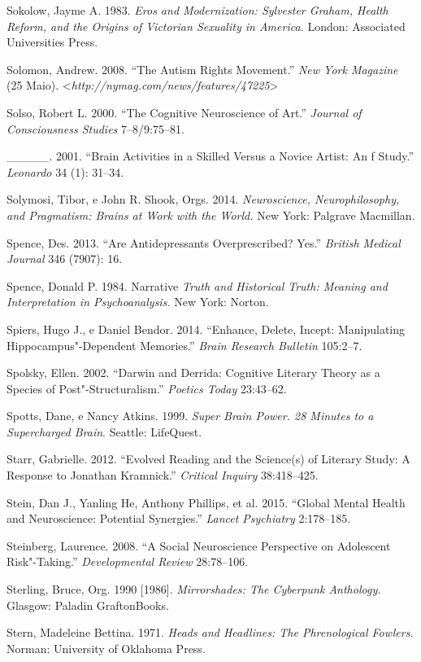 {\begin{Parskip}
Sokolow, Jayme A. 1983. \emph{Eros and Modernization: Sylvester Graham,
Health Reform, and the Origins of Victorian Sexuality in America.}
London: Associated Universities Press.

Solomon, Andrew. 2008. ``The Autism Rights Movement.'' \emph{New York
Magazine} (25 Maio). \textless{}\emph{http://nymag.com/news/features/47225}\textgreater{}

Solso, Robert L. 2000. ``The Cognitive Neuroscience of Art.''
\emph{Journal of Consciousness Studies} 7--8/9:75--81.

\_\_\_\_\_. 2001. ``Brain Activities in a Skilled Versus a Novice Artist:
An f Study.'' \emph{Leonardo} 34 (1): 31--34.

Solymosi, Tibor, e John R. Shook, Orgs. 2014. \emph{Neuroscience,
Neurophilosophy, and Pragmatism: Brains at Work with the World.} New
York: Palgrave Macmillan.

Spence, Des. 2013. ``Are Antidepressants Overprescribed? Yes.''
\emph{British Medical Journal} 346 (7907): 16.

Spence, Donald P. 1984. Narrative \emph{Truth and Historical Truth:
Meaning and Interpretation in Psychoanalysis.} New York: Norton.

Spiers, Hugo J., e Daniel Bendor. 2014. ``Enhance, Delete, Incept:
Manipulating Hippocampus"-Dependent Memories.'' \emph{Brain Research
Bulletin} 105:2--7.

Spolsky, Ellen. 2002. ``Darwin and Derrida: Cognitive Literary Theory as
a Species of Post"-Structuralism.'' \emph{Poetics Today} 23:43--62.

Spotts, Dane, e Nancy Atkins. 1999. \emph{Super Brain Power. 28 Minutes
to a Supercharged Brain}. Seattle: LifeQuest.

Starr, Gabrielle. 2012. ``Evolved Reading and the Science(s) of Literary
Study: A Response to Jonathan Kramnick.'' \emph{Critical Inquiry}
38:418--425.

Stein, Dan J., Yanling He, Anthony Phillips, et al. 2015. ``Global
Mental Health and Neuroscience: Potential Synergies.'' \emph{Lancet
Psychiatry} 2:178--185.

Steinberg, Laurence. 2008. ``A Social Neuroscience Perspective on
Adolescent Risk"-Taking.'' \emph{Developmental Review} 28:78--106.

Sterling, Bruce, Org. 1990 {[}1986{]}. \emph{Mirrorshades: The Cyberpunk
Anthology.} Glasgow: Paladin GraftonBooks.

Stern, Madeleine Bettina. 1971. \emph{Heads and Headlines: The
Phrenological Fowlers.} Norman: University of Oklahoma Press.


\end{Parskip}}
